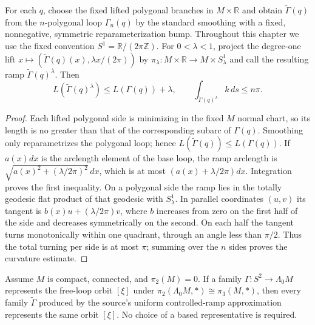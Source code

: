 \begin{theorem}
\label{lem:smoothed-polygonal-ramp-bounds}
\notready
For each $q$, choose the fixed lifted polygonal branches in
$M\times\mathbb R$ and obtain $\widetilde\Gamma(q)$ from the $n$-polygonal
loop $\Gamma_n(q)$ by the standard smoothing with a fixed, nonnegative,
symmetric reparameterization bump.  Throughout this chapter we use the fixed
convention $S^1=\mathbb R/(2\pi\mathbb Z)$.  For $0<\lambda<1$, project the
degree-one lift $x\mapsto(\widetilde\Gamma(q)(x),\lambda x/(2\pi))$ by
$\pi_\lambda\colon M\times\mathbb R\to M\times S^1_\lambda$ and call the
resulting ramp $\widetilde\Gamma(q)^\lambda$.  Then
\[
 L(\widetilde\Gamma(q)^\lambda)
 \le L(\Gamma(q))+\lambda,
 \qquad
 \int_{\widetilde\Gamma(q)^\lambda}k\,ds\le n\pi .
\]
\end{theorem}
\begin{proof}
Each lifted polygonal side is minimizing in the fixed $M$ normal chart, so its
length is no greater than that of
the corresponding subarc of $\Gamma(q)$.  Smoothing only reparametrizes the
polygonal loop; hence $L(\widetilde\Gamma(q))\le L(\Gamma(q))$.  If
$a(x)dx$ is the arclength element of the base loop, the ramp arclength is
$\sqrt{a(x)^2+(\lambda/2\pi)^2}\,dx$, which is at most
$(a(x)+\lambda/2\pi)dx$.  Integration proves the first inequality.  On a
polygonal side the ramp lies in the totally geodesic flat product of that
geodesic with $S^1_\lambda$.  In parallel coordinates $(u,v)$ its tangent is
$b(x)u+(\lambda/2\pi)v$, where $b$ increases from zero on the first half of
the side and decreases symmetrically on the second.  On each half the tangent
turns monotonically within one quadrant, through an angle less than
$\pi/2$.  Thus the total turning per side is at most $\pi$; summing over the
$n$ sides proves the curvature estimate.
\end{proof}

\begin{lemma}
\label{lem:free-loop-approximation-preserves-pi1-orbit}
\notready
Assume $M$ is compact, connected, and $\pi_2(M)=0$.  If a family
$\Gamma\colon S^2\to\Lambda_0M$ represents the free-loop orbit
$[\xi]$ under
$\pi_2(\Lambda_0M,*)\cong\pi_3(M,*)$, then every family
$\widetilde\Gamma$ produced by the source's uniform controlled-ramp
approximation represents the same orbit
$[\xi]$.  No choice of a based representative is required.
\end{lemma}

